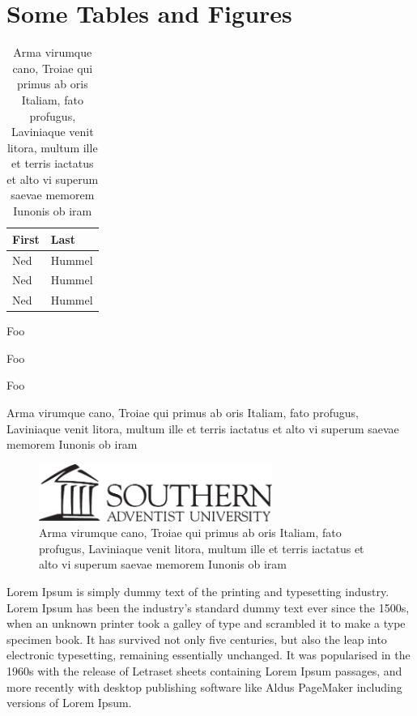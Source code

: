 \documentclass[ms,twoside,print]{nuthesis}
\theoremstyle{definition}
\begin{document}
\chapter{Some Tables and Figures}

\begin{table}[h]
  \centering
  \begin{tabular}{ll}\toprule
    First & Last \\ \midrule
    Ned & Hummel \\
    Ned & Hummel \\
    Ned & Hummel \\ \bottomrule
  \end{tabular}
  \caption{Arma virumque cano, Troiae qui primus ab oris Italiam, fato profugus,
Laviniaque venit litora, multum ille et terris iactatus et alto vi
superum saevae memorem Iunonis ob iram}
  \label{tab:tabular}
\end{table}

\begin{table}[h]
  \centering

  \begin{compactitem}[\checkmark]
    \item Foo
    \item Foo
    \item Foo
    \end{compactitem}

  \caption{Arma virumque cano, Troiae qui primus ab oris Italiam, fato profugus,
Laviniaque venit litora, multum ille et terris iactatus et alto vi
superum saevae memorem Iunonis ob iram}
  \label{tab:list}
\end{table}

\begin{figure}[h]
  \centering
  \includegraphics[width=3in]{logoBlackH}
  \caption{Arma virumque cano, Troiae qui primus ab oris Italiam, fato profugus,
Laviniaque venit litora, multum ille et terris iactatus et alto vi
superum saevae memorem Iunonis ob iram}
  \label{fig:test}
\end{figure}

Lorem Ipsum is simply dummy text of the printing and typesetting industry. Lorem Ipsum has been the industry's standard dummy text ever since the 1500s, when an unknown printer took a galley of type and scrambled it to make a type specimen book. It has survived not only five centuries, but also the leap into electronic typesetting, remaining essentially unchanged. It was popularised in the 1960s with the release of Letraset sheets containing Lorem Ipsum passages, and more recently with desktop publishing software like Aldus PageMaker including versions of Lorem Ipsum.
\end{document}
